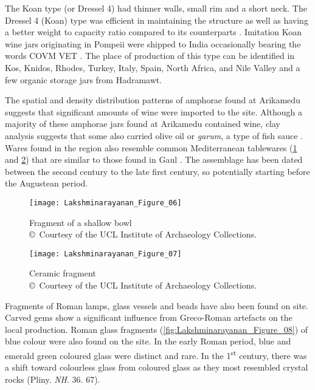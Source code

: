 The Koan type (or Dressel 4) had thinner walls, small rim and a short neck. The Dressel 4 (Koan) type was efficient in maintaining the structure as well as having a better weight to capacity ratio compared to its counterparts \parencites[][229]{empereur1989}[][117]{laubenheimer1990}. Imitation Koan wine jars originating in Pompeii were shipped to India occasionally bearing the words COVM VET \parencite[][263]{will2001}. The place of production of this type can be identified in Kos, Knidos, Rhodes, Turkey, Italy, Spain, North Africa, and Nile Valley and a few organic storage jars from Hadramawt.

The spatial and density distribution patterns of amphorae found at Arikamedu suggests that significant amounts of wine were imported to the site. Although a majority of these amphorae jars found at Arikamedu contained wine, clay analysis suggests that some also carried olive oil or \emph{garum}, a type of fish sauce \parencite[][150]{will1992a}. Wares found in the region also resemble common Mediterranean tablewares (\cref{fig:Lakshminarayanan_Figure_06} and \cref{fig:Lakshminarayanan_Figure_07}) that are similar to those found in Gaul \parencite[][69]{frakes2009}. The assemblage has been dated between the second century \BC to the late first century\AD, so potentially starting before the Augustean period.

\begin{figure}[!htb]
	\texttt{[image: Lakshminarayanan\_Figure\_06]}
	\caption{Fragment of a shallow bowl\\
		{\normalfont\scriptsize\copyright\ Courtesy of the UCL Institute of Archaeology Collections.
	}}
	\label{fig:Lakshminarayanan_Figure_06}
\end{figure}

\begin{figure}[!htb]
	\texttt{[image: Lakshminarayanan\_Figure\_07]}
	\caption{Ceramic fragment\\
		{\normalfont\scriptsize\copyright\ Courtesy of the UCL Institute of Archaeology Collections.
	}}
	\label{fig:Lakshminarayanan_Figure_07}
\end{figure}

Fragments of Roman lamps, glass vessels and beads have also been found on site. Carved gems show a significant influence from Greco-Roman artefacts on the local production. Roman glass fragments (\cref{fig:Lakshminarayanan_Figure_08}) of blue colour were also found on the site.  In the early Roman period, blue and emerald green coloured glass were distinct and rare. In the 1\textsuperscript{st} century\AD, there was a shift toward colourless glass from coloured glass as they most resembled crystal rocks (Pliny. \emph{NH}. 36. 67).

